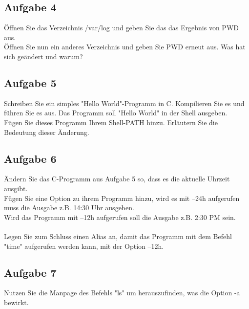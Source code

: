 \documentclass{article}
\begin{document}
    \subsection{Aufgabe 4}
    Öffnen Sie das Verzeichnis /var/log und geben Sie das das Ergebnis von PWD aus. \\
    Öffnen Sie nun ein anderes Verzeichnis und geben Sie PWD erneut aus. Was hat sich geändert und warum?

    \subsection{Aufgabe 5}
    Schreiben Sie ein simples "Hello World"-Programm in C. Kompilieren Sie es und führen Sie es aus.
    Das Programm soll "Hello World" in der Shell ausgeben. \\
    Fügen Sie dieses Programm Ihrem Shell-PATH hinzu. Erläutern Sie die Bedeutung dieser Änderung.

    \subsection{Aufgabe 6}
    Ändern Sie das C-Programm aus Aufgabe 5 so, dass es die aktuelle Uhrzeit ausgibt. \\
    Fügen Sie eine Option zu ihrem Programm hinzu, wird es mit --24h aufgerufen muss die Ausgabe z.B. 14:30 Uhr ausgeben. \\
    Wird das Programm mit --12h aufgerufen soll die Ausgabe z.B. 2:30 PM sein. \\ \\
    Legen Sie zum Schluss einen Alias an, damit das Programm mit dem Befehl "time" aufgerufen werden kann, mit der Option --12h.

    \subsection{Aufgabe 7}
    Nutzen Sie die Manpage des Befehls "ls" um herauszufinden, was die Option -a bewirkt.
\end{document}
